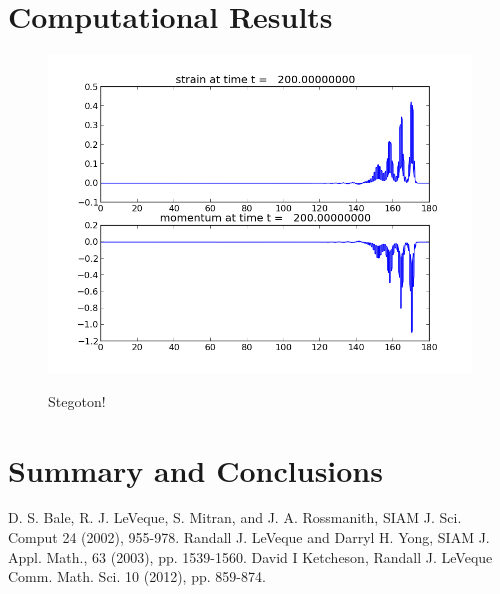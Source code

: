 \documentclass{article}
\begin{document}
\section{Computational Results}
\begin{figure}
  \centering
  \includegraphics[width=\textwidth]{frame0040fig1.png}\\
  \caption{Stegoton!}\label{stegoton}
\end{figure}


\section{Summary and Conclusions}




\begin{thebibliography}{9}
D. S. Bale, R. J. LeVeque, S. Mitran, and J. A. Rossmanith, SIAM J. Sci. Comput 24 (2002), 955-978.
Randall J. LeVeque and Darryl H. Yong, SIAM J. Appl. Math., 63 (2003), pp. 1539-1560.
David I Ketcheson, Randall J. LeVeque Comm. Math. Sci. 10 (2012), pp. 859-874.
\end{thebibliography}
\end{document}
